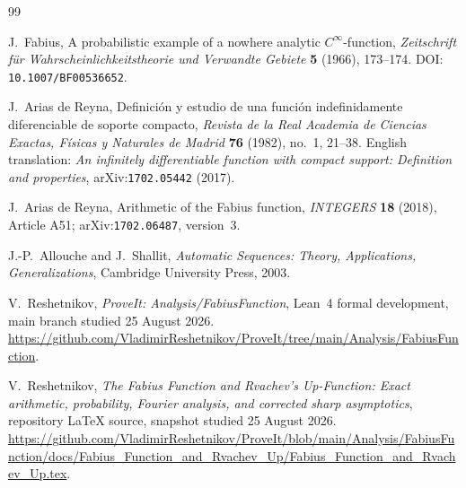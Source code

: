\documentclass[11pt,oneside]{article}
\theoremstyle{definition}
\theoremstyle{remark}
\begin{document}
\renewcommand{\refname}{Dossier references}
\begin{thebibliography}{99}

J.~Fabius,
\newblock A probabilistic example of a nowhere analytic $C^\infty$-function,
\newblock \emph{Zeitschrift für Wahrscheinlichkeitstheorie und Verwandte Gebiete}
  \textbf{5} (1966), 173--174.
\newblock DOI: \nolinkurl{10.1007/BF00536652}.

J.~Arias de Reyna,
\newblock Definición y estudio de una función indefinidamente diferenciable de
  soporte compacto,
\newblock \emph{Revista de la Real Academia de Ciencias Exactas, Físicas y
  Naturales de Madrid} \textbf{76} (1982), no.~1, 21--38.
\newblock English translation: \emph{An infinitely differentiable function with
  compact support: Definition and properties}, arXiv:\nolinkurl{1702.05442} (2017).

J.~Arias de Reyna,
\newblock Arithmetic of the Fabius function,
\newblock \emph{INTEGERS} \textbf{18} (2018), Article A51;
  arXiv:\nolinkurl{1702.06487}, version~3.

J.-P.~Allouche and J.~Shallit,
\newblock \emph{Automatic Sequences: Theory, Applications, Generalizations},
\newblock Cambridge University Press, 2003.

V.~Reshetnikov,
\newblock \emph{ProveIt: Analysis/FabiusFunction},
\newblock Lean~4 formal development, main branch studied 25 August 2026.
\newblock \url{https://github.com/VladimirReshetnikov/ProveIt/tree/main/Analysis/FabiusFunction}.

V.~Reshetnikov,
\newblock \emph{The Fabius Function and Rvachev's Up-Function: Exact arithmetic,
  probability, Fourier analysis, and corrected sharp asymptotics},
\newblock repository LaTeX source, snapshot studied 25 August 2026.
\newblock \url{https://github.com/VladimirReshetnikov/ProveIt/blob/main/Analysis/FabiusFunction/docs/Fabius_Function_and_Rvachev_Up/Fabius_Function_and_Rvachev_Up.tex}.

\end{thebibliography}


\renewcommand{\arraystretch}{1}


\clearpage
\end{document}
